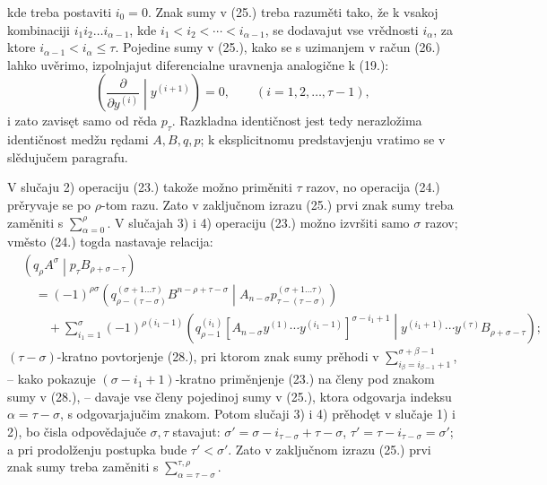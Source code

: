 \documentclass[11pt]{article}
\newcommand{\pair}[2]{\left(#1\middle|#2\right)}
\begin{document}
kde treba postaviti $i_0=0$. Znak sumy v (25.) treba razuměti tako, že k vsakoj kombinaciji $i_1i_2\ldots i_{\alpha-1}$, kde $i_1<i_2<\cdots<i_{\alpha-1}$, se dodavajut vse vrědnosti $i_\alpha$, za ktore $i_{\alpha-1}<i_\alpha\le\tau$. Pojedine sumy v (25.), kako se s uzimanjem v račun (26.) lahko uvěrimo, izpolnjajut diferencialne uravnenja analogične k (19.):
\begin{equation}
 \left(\frac{\partial}{\partial y^{(i)}}\middle|y^{(i+1)}\right)=0,
 \qquad (i=1,2,\ldots,\tau-1),
\tag{27}
\end{equation}
i zato zavisęt samo od rěda $p_\tau$. Razkladna identičnost jest tedy nerazložima identičnost medžu rędami $A,B,q,p$; k eksplicitnomu predstavjenju vratimo se v slědujučem paragrafu.

V slučaju 2) operaciju (23.) takože možno priměniti $\tau$ razov, no operacija (24.) prěryvaje se po $\rho$-tom razu. Zato v zaključnom izrazu (25.) prvi znak sumy treba zaměniti s $\sum_{\alpha=0}^{\rho}$. V slučajah 3) i 4) operaciju (23.) možno izvršiti samo $\sigma$ razov; vměsto (24.) togda nastavaje relacija:
\begin{equation}
\begin{aligned}
&\pair{q_\rho A^\sigma}{p_\tau B_{\rho+\sigma-\tau}}\\
&\quad=(-1)^{\rho\sigma}
\pair{q_{\rho-(\tau-\sigma)}^{(\sigma+1\ldots\tau)}B^{n-\rho+\tau-\sigma}}
{A_{n-\sigma}p_{\tau-(\tau-\sigma)}^{(\sigma+1\ldots\tau)}}\\
&\qquad+\sum_{i_1=1}^{\sigma}(-1)^{\rho(i_1-1)}
\pair{q_{\rho-1}^{(i_1)}
[A_{n-\sigma}y^{(1)}\cdots y^{(i_1-1)}]^{\sigma-i_1+1}}
{y^{(i_1+1)}\cdots y^{(\tau)}B_{\rho+\sigma-\tau}};
\end{aligned}
\tag{28}
\end{equation}
$(\tau-\sigma)$-kratno povtorjenje (28.), pri ktorom znak sumy prěhodi v $\sum_{i_\beta=i_{\beta-1}+1}^{\sigma+\beta-1}$, -- kako pokazuje $(\sigma-i_1+1)$-kratno priměnjenje (23.) na členy pod znakom sumy v (28.), -- davaje vse členy pojedinoj sumy v (25.), ktora odgovarja indeksu $\alpha=\tau-\sigma$, s odgovarjajučim znakom. Potom slučaji 3) i 4) prěhodęt v slučaje 1) i 2), bo čisla odpovědajuče $\sigma,\tau$ stavajut: $\sigma'=\sigma-i_{\tau-\sigma}+\tau-\sigma$, $\tau'=\tau-i_{\tau-\sigma}=\sigma'$; a pri prodolženju postupka bude $\tau'<\sigma'$. Zato v zaključnom izrazu (25.) prvi znak sumy treba zaměniti s $\sum_{\alpha=\tau-\sigma}^{\tau,\rho}$.
\end{document}
